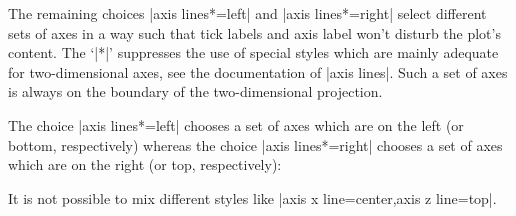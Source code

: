 {The remaining choices |axis lines*=left| and |axis lines*=right| select
different sets of axes in a way such that tick labels and axis label won't
disturb the plot's content. The `|*|' suppresses the use of special styles
which are mainly adequate for two-dimensional axes, see the documentation of
|axis lines|. Such a set of axes is always on the boundary of the
two-dimensional projection.

The choice |axis lines*=left| chooses a set of axes which are on the left (or
bottom, respectively) whereas the choice |axis lines*=right| chooses a set of
axes which are on the right (or top, respectively):

\begin{codeexample}[]
\end{codeexample}

\begin{codeexample}[]
\end{codeexample}

It is not possible to mix different styles like
|axis x line=center,axis z line=top|.

}
